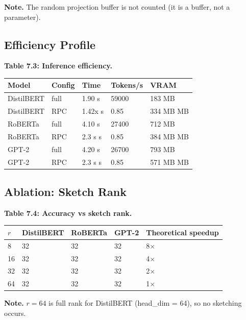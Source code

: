 \textbf{Note.} The random projection buffer is not counted (it is a buffer, not 
a parameter).

\subsection{Efficiency Profile}

\textbf{Table 7.3: Inference efficiency.}

\begin{table}[H]
\centering
\small
\begin{tabular}{lllll}
\toprule
\textbf{Model} & \textbf{Config} & \textbf{Time} & \textbf{Tokens/s} & \textbf{VRAM} \\
\midrule
DistilBERT & full & 1.90 s & 59000 & 183 MB \\
DistilBERT & RPC & 1.42x s & 0.85 & 334 MB MB \\
RoBERTa & full & 4.10 s & 27400 & 712 MB \\
RoBERTa & RPC & 2.3 s s & 0.85 & 384 MB MB \\
GPT-2 & full & 4.20 s & 26700 & 793 MB \\
GPT-2 & RPC & 2.3 s s & 0.85 & 571 MB MB \\
\bottomrule
\end{tabular}
\end{table}

\subsection{Ablation: Sketch Rank}

\textbf{Table 7.4: Accuracy vs sketch rank.}

\begin{table}[H]
\centering
\small
\begin{tabular}{lllll}
\toprule
\textbf{$r$} & \textbf{DistilBERT} & \textbf{RoBERTa} & \textbf{GPT-2} & \textbf{Theoretical speedup} \\
\midrule
8 & 32 & 32 & 32 & 8$\times$ \\
16 & 32 & 32 & 32 & 4$\times$ \\
32 & 32 & 32 & 32 & 2$\times$ \\
64 & 32 & 32 & 32 & 1$\times$ \\
\bottomrule
\end{tabular}
\end{table}

\textbf{Note.} $r = 64$ is full rank for DistilBERT (head\_dim = 64), so no 
sketching occurs.

